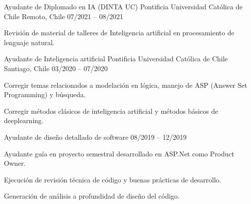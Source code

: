 

\begin{cventries}

\cventry
{Ayudante de Diplomado en IA (DINTA UC)} %
{Pontificia Universidad Católica de Chile} %
{Remoto, Chile} %
{07/2021 – 08/2021} %
{
  \begin{cvitems} %
    \item {Revisión de material de talleres de Inteligencia artificial en procesamiento de lenguaje natural.}
  \end{cvitems}
}
  \cventry
    {Ayudante de Inteligencia artificial} %
    {Pontificia Universidad Católica de Chile} %
    {Santiago, Chile} %
    {03/2020 – 07/2020} %
    {
      \begin{cvitems} %
        \item {Corregir temas relacionados a modelación en lógica, manejo de ASP (Answer Set Programming) y búsqueda.}
        \item {Corregir métodos clásicos de inteligencia artificial y métodos básicos de deeplearning.}
      \end{cvitems}
    }

  \cventry
    {Ayudante de diseño detallado de software} %
    {} %
    {} %
    {08/2019 – 12/2019} %
    {
      \begin{cvitems} %
        \item {Ayudante guía en proyecto semestral desarrollado en ASP.Net como Product Owner.}
        \item {Ejecución de revisión técnica de código y buenas prácticas de desarrollo.}
        \item {Generación de análisis a profundidad de diseño del código.}
      \end{cvitems}
    }


\end{cventries}
